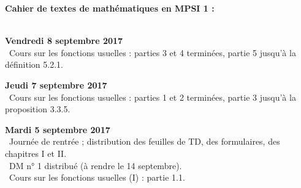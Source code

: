 \documentclass[12pt,a4paper]{article}
\begin{document}
\begin{center}
\Large\bf Cahier de textes de mathématiques en MPSI 1 :
\end{center}
\vspace{1cm}
\vspace{.4cm}\\

\noindent\textbf{Vendredi 8 septembre 2017}\\
\bu\ Cours sur les fonctions usuelles : parties 3 et 4 terminées, partie 5 jusqu'à la définition 5.2.1. \\
\vspace{.4cm}

\noindent\textbf{Jeudi 7 septembre 2017}\\
\bu\ Cours sur les fonctions usuelles : parties 1 et 2 terminées, partie 3 jusqu'à la proposition 3.3.5. \\
\vspace{.4cm}

\noindent\textbf{Mardi 5 septembre 2017}\\
\bu\ Journée de rentrée ; distribution des feuilles de TD, des formulaires, des
chapitres I et II.  \\
\bu\ DM n° 1 distribué (à rendre le 14 septembre). \\
\bu\ Cours sur les fonctions usuelles (I) : partie 1.1. \\
\vspace{.4cm}


\label{end}
\end{document}

